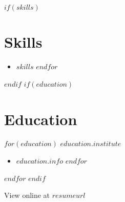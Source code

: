 \documentclass[$fontsize$, letterpaper]{article}
\begin{document}
\begin{multicols}{2}
$if(skills)$
\section*{Skills}
\begin{itemize}
    $for(skills)$
      \item $skills$
    $endfor$
\end{itemize}
$endif$
\columnbreak
$if(education)$
\section*{Education}
\noindent
$for(education)$
\textbf{$education.institute$}
\begin{itemize}
    $for(education.info)$
    \item $education.info$
    $endfor$
\end{itemize}
$endfor$
$endif$
\end{multicols}

\vspace{0.2cm}
\hspace*{-1.5cm}\footnotesize{View online at \href{http://$resumeurl$}{$resumeurl$}}
\end{document}

